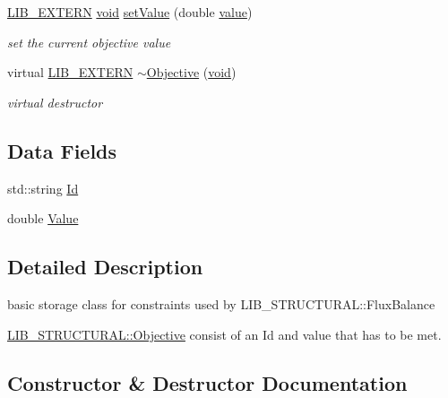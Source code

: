 \begin{DoxyCompactItemize}
\hyperlink{libutil_8h_a48cc004c21e097c0d7c1c5fa8dc03b96}{L\+I\+B\+\_\+\+E\+X\+T\+E\+RN} \hyperlink{lp__lib_8h_ac7828c7b2b31d2e11af17bdb6289c5d9}{void} \hyperlink{class_l_i_b___s_t_r_u_c_t_u_r_a_l_1_1_objective_a78216246f2d3536f0290e91d68150487}{set\+Value} (double \hyperlink{lp__lib_8h_a606ba870f46e132d61b5e2371014a998}{value})
\begin{DoxyCompactList}\small\item\em set the current objective value \end{DoxyCompactList}\item 
virtual \hyperlink{libutil_8h_a48cc004c21e097c0d7c1c5fa8dc03b96}{L\+I\+B\+\_\+\+E\+X\+T\+E\+RN} \hyperlink{class_l_i_b___s_t_r_u_c_t_u_r_a_l_1_1_objective_a24c7e7a5d88bb8160339ccd3416c7089}{$\sim$\+Objective} (\hyperlink{lp__lib_8h_ac7828c7b2b31d2e11af17bdb6289c5d9}{void})
\begin{DoxyCompactList}\small\item\em virtual destructor \end{DoxyCompactList}\end{DoxyCompactItemize}
\subsection*{Data Fields}
\begin{DoxyCompactItemize}
\item 
std\+::string \hyperlink{class_l_i_b___s_t_r_u_c_t_u_r_a_l_1_1_objective_aa8263b47a8a71acc061d15fba04879c7}{Id}
\item 
double \hyperlink{class_l_i_b___s_t_r_u_c_t_u_r_a_l_1_1_objective_ad16219309ff97937c5e4fec319abe863}{Value}
\end{DoxyCompactItemize}


\subsection{Detailed Description}
basic storage class for constraints used by L\+I\+B\+\_\+\+S\+T\+R\+U\+C\+T\+U\+R\+A\+L\+::\+Flux\+Balance 

\begin{DoxyParagraph}{}
\hyperlink{class_l_i_b___s_t_r_u_c_t_u_r_a_l_1_1_objective}{L\+I\+B\+\_\+\+S\+T\+R\+U\+C\+T\+U\+R\+A\+L\+::\+Objective} consist of an Id and value that has to be met. 
\end{DoxyParagraph}


\subsection{Constructor \& Destructor Documentation}
\mbox{\label{class_l_i_b___s_t_r_u_c_t_u_r_a_l_1_1_objective_a6b731a65cbefc80f0cde3763126a5284}} 
